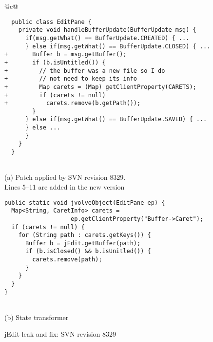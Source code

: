 \begin{figure}[p]
\lstset{frame=single}
\begin{center}
\begin{tabular}{@{}c@{}}
\begin{minipage}{0.95\textwidth}
\begin{lstlisting}
  public class EditPane {
    private void handleBufferUpdate(BufferUpdate msg) {
      if(msg.getWhat() == BufferUpdate.CREATED) { ...
      } else if(msg.getWhat() == BufferUpdate.CLOSED) { ...
+       Buffer b = msg.getBuffer();
+       if (b.isUntitled()) {
+         // the buffer was a new file so I do
+         // not need to keep its info
+         Map carets = (Map) getClientProperty(CARETS);
+         if (carets != null)
+           carets.remove(b.getPath());
        }
      } else if(msg.getWhat() == BufferUpdate.SAVED) { ...
      } else ...
      }
    }
  }
\end{lstlisting}
\end{minipage} \\
(a) Patch applied by SVN revision 8329. \\
Lines 5--11 are added in the new version \\[1ex]
\begin{minipage}{0.95\textwidth}
\begin{lstlisting}
public static void jvolveObject(EditPane ep) {
  Map<String, CaretInfo> carets =
                   ep.getClientProperty("Buffer->Caret");
  if (carets != null) {
    for (String path : carets.getKeys()) {
      Buffer b = jEdit.getBuffer(path);
      if (b.isClosed() && b.isUnitled()) {
        carets.remove(path);
      }
    }
  }
}
\end{lstlisting}
\end{minipage} \\
(b) State transformer
\end{tabular}
\caption{jEdit leak and fix: SVN revision 8329\label{fig:r8329}}
\end{center}
\lstset{frame=none}
\end{figure}
